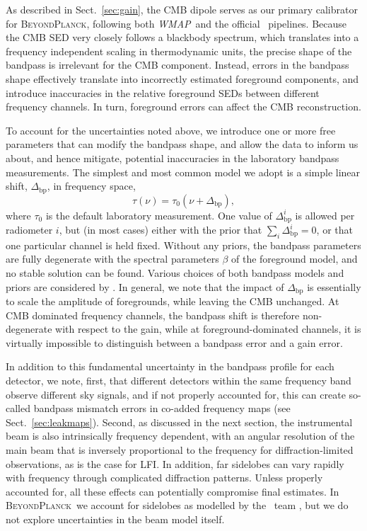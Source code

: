 \documentclass[twocolumn]{aa}
\def\WMAP{\emph{WMAP}}
\newcommand{\BP}{\textsc{BeyondPlanck}}
\begin{document}
As described in Sect.~\ref{sec:gain}, the CMB dipole serves as our primary
calibrator for \BP, following both \WMAP\ and the official
\Planck\ pipelines. Because the CMB SED very closely follows a
blackbody spectrum, which translates into a frequency independent
scaling in thermodynamic units, the precise shape of the bandpass is
irrelevant for the CMB component. Instead, errors in the bandpass
shape effectively translate into incorrectly estimated foreground
components, and introduce inaccuracies in the relative foreground
SEDs between different frequency channels. In turn, foreground errors
can affect the CMB reconstruction.

To account for the uncertainties noted above, we introduce one or more
free parameters that can modify the bandpass shape, and allow the data
to inform us about, and hence mitigate, potential inaccuracies in the
laboratory bandpass measurements. The simplest and most common model
we adopt is a simple linear shift, $\Delta_{\mathrm{bp}}$, in
frequency space,
\begin{equation}
  \tau(\nu) = \tau_0(\nu+\Delta_{\mathrm{bp}}),
  \label{eq:bp_shift}
\end{equation}
where $\tau_0$ is the default laboratory measurement. One value of
$\Delta_{\mathrm{bp}}^i$ is allowed per radiometer $i$, but (in most
cases) either with the prior that $\sum_i \Delta_{\mathrm{bp}}^i = 0$,
or that one particular channel is held fixed. Without any priors, the
bandpass parameters are fully degenerate with the spectral parameters
$\beta$ of the foreground model, and no stable solution can be
found. Various choices of both bandpass models and priors are
considered by \citet{bp09}. In general, we note that the impact of
$\Delta_{\mathrm{bp}}$ is essentially to scale the amplitude of
foregrounds, while leaving the CMB unchanged. At CMB dominated
frequency channels, the bandpass shift is therefore non-degenerate
with respect to the gain, while at foreground-dominated channels, it
is virtually impossible to distinguish between a bandpass error and a
gain error.

In addition to this fundamental uncertainty in the bandpass profile
for each detector, we note, first, that different detectors within the
same frequency band observe different sky signals, and if not properly
accounted for, this can create so-called bandpass mismatch errors in
co-added frequency maps (see Sect.~\ref{sec:leakmaps}). Second, as
discussed in the next section, the instrumental beam is also
intrinsically frequency dependent, with an angular resolution of the
main beam that is inversely proportional to the frequency for
diffraction-limited observations, as is the case for LFI.  In
addition, far sidelobes can vary rapidly with frequency through
complicated diffraction patterns. Unless properly accounted for, all
these effects can potentially compromise final estimates. In \BP\ we
account for sidelobes as modelled by the \Planck\ team
\citep{planck2014-a05}, but we do not explore uncertainties in the
beam model itself.
\end{document}
